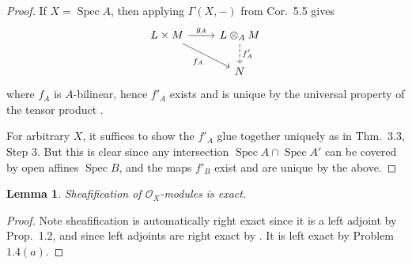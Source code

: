 \documentclass[12pt,letterpaper]{article}
\newtheorem{lemma}{Lemma}[section]
\theoremstyle{definition}
\theoremstyle{remark}
\numberwithin{equation}{section}
\numberwithin{figure}{problem}
\DeclareMathOperator{\Spec}{Spec}
\newcommand{\OO}{\mathcal{O}}
\begin{document}
\begin{proof}
  If $X = \Spec A$, then applying $\Gamma(X,-)$ from Cor.~5.5 gives
  \begin{equation*}
    \begin{tikzcd}
      L \times M \rar{g_A}\arrow{dr}[swap]{f_A} & L \otimes_A M\dar[dashed]{f'_A}\\
      & N
    \end{tikzcd}
  \end{equation*}
  where $f_A$ is $A$-bilinear, hence $f'_A$ exists and is unique by the universal property of the tensor product \cite[Prop.~2.12]{AM69}.
  \par For arbitrary $X$, it suffices to show the $f'_A$ glue together uniquely as in Thm.~3.3, Step 3. But this is clear since any intersection $\Spec A \cap \Spec A'$ can be covered by open affines $\Spec B$, and the maps $f'_B$ exist and are unique by the above.
\end{proof}
\begin{lemma}\label{sheafifyexact}
  Sheafification of $\OO_X$-modules is exact.
\end{lemma}
\begin{proof}
  Note sheafification is automatically right exact since it is a left adjoint by Prop.~1.2, and since left adjoints are right exact by \cite[Thm.~2.6.1]{Wei94}. It is left exact by Problem $1.4(a)$.
\end{proof}
\end{document}
